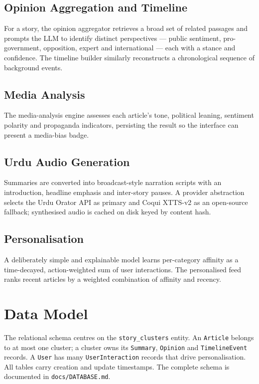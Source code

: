 \documentclass[11pt,a4paper]{article}
\begin{document}
\subsection{Opinion Aggregation and Timeline}
For a story, the opinion aggregator retrieves a broad set of related passages
and prompts the LLM to identify distinct perspectives --- public sentiment,
pro-government, opposition, expert and international --- each with a stance and
confidence. The timeline builder similarly reconstructs a chronological
sequence of background events.

\subsection{Media Analysis}
The media-analysis engine assesses each article's tone, political leaning,
sentiment polarity and propaganda indicators, persisting the result so the
interface can present a media-bias badge.

\subsection{Urdu Audio Generation}
Summaries are converted into broadcast-style narration scripts with an
introduction, headline emphasis and inter-story pauses. A provider abstraction
selects the Urdu Orator API as primary and Coqui XTTS-v2 as an open-source
fallback; synthesised audio is cached on disk keyed by content hash.

\subsection{Personalisation}
A deliberately simple and explainable model learns per-category affinity as a
time-decayed, action-weighted sum of user interactions. The personalised feed
ranks recent articles by a weighted combination of affinity and recency.

\section{Data Model}

The relational schema centres on the \texttt{story\_clusters} entity. An
\texttt{Article} belongs to at most one cluster; a cluster owns its
\texttt{Summary}, \texttt{Opinion} and \texttt{TimelineEvent} records. A
\texttt{User} has many \texttt{UserInteraction} records that drive
personalisation. All tables carry creation and update timestamps. The complete
schema is documented in \texttt{docs/DATABASE.md}.
\end{document}
